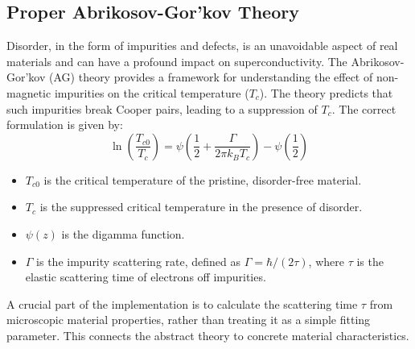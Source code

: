 \subsection{Proper Abrikosov-Gor'kov Theory}
Disorder, in the form of impurities and defects, is an unavoidable aspect of real materials and can have a profound impact on superconductivity. The Abrikosov-Gor'kov (AG) theory provides a framework for understanding the effect of non-magnetic impurities on the critical temperature ($T_c$). The theory predicts that such impurities break Cooper pairs, leading to a suppression of $T_c$. The correct formulation is given by:
\begin{equation}
\ln\left(\frac{T_{c0}}{T_c}\right) = \psi\left(\frac{1}{2} + \frac{\Gamma}{2\pi k_B T_c}\right) - \psi\left(\frac{1}{2}\right)
\label{eq:ag}
\end{equation}

\begin{itemize}
    \item $T_{c0}$ is the critical temperature of the pristine, disorder-free material.
    \item $T_c$ is the suppressed critical temperature in the presence of disorder.
    \item $\psi(z)$ is the digamma function.
    \item $\Gamma$ is the impurity scattering rate, defined as $\Gamma = \hbar / (2\tau)$, where $\tau$ is the elastic scattering time of electrons off impurities.
\end{itemize}
A crucial part of the implementation is to calculate the scattering time $\tau$ from microscopic material properties, rather than treating it as a simple fitting parameter. This connects the abstract theory to concrete material characteristics.
